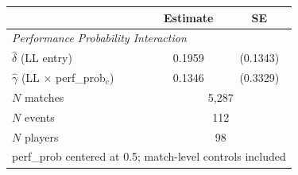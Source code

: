 \begin{tabular}{lcc}
\toprule
 & Estimate & SE \\
\midrule
\multicolumn{3}{l}{\textit{Performance Probability Interaction}} \\[3pt]
$\hat{\delta}$ (LL entry) & 0.1959 & (0.1343) \\
$\hat{\gamma}$ (LL $\times$ perf\_prob$_c$) & 0.1346 & (0.3329) \\
\midrule
$N$ matches & \multicolumn{2}{c}{5,287} \\
$N$ events & \multicolumn{2}{c}{112} \\
$N$ players & \multicolumn{2}{c}{98} \\
\multicolumn{3}{l}{perf\_prob centered at 0.5; match-level controls included} \\
\bottomrule
\end{tabular}
